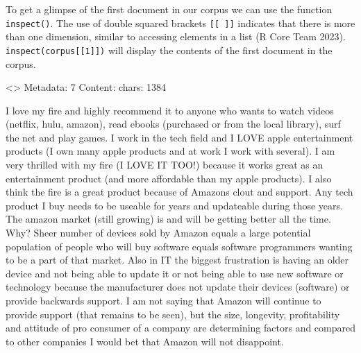 To get a glimpse of the first document in our corpus we can use the function
\texttt{inspect()}. The use of double squared brackets
\texttt{{[}{[}\ {]}{]}} indicates that there is more than one dimension,
similar to accessing elements in a list (R Core Team 2023).
\texttt{inspect(corpus{[}{[}1{]}{]})} will display the contents of the
first document in the corpus.

\begin{Shaded}
\begin{Highlighting}[]

\NormalTok{(} \NormalTok{)}

\OtherTok{\textless{}{-}} \NormalTok{(}\NormalTok{)}

\OtherTok{\textless{}{-}} \SpecialCharTok{$}

\OtherTok{\textless{}{-}} \NormalTok{(}

\NormalTok{(docs[[}\NormalTok{]])}
\end{Highlighting}
\end{Shaded}

\textless{}\textgreater{} Metadata: 7 Content: chars: 1384

I love my fire and highly recommend it to anyone who wants to watch
videos (netflix, hulu, amazon), read ebooks (purchased or from the local
library), surf the net and play games. I work in the tech field and I
LOVE apple entertainment products (I own many apple products and at work
I work with several). I am very thrilled with my fire (I LOVE IT TOO!)
because it works great as an entertainment product (and more affordable
than my apple products). I also think the fire is a great product
because of Amazons clout and support. Any tech product I buy needs to be
useable for years and updateable during those years. The amazon market
(still growing) is and will be getting better all the time. Why? Sheer
number of devices sold by Amazon equals a large potential population of
people who will buy software equals software programmers wanting to be a
part of that market. Also in IT the biggest frustration is having an
older device and not being able to update it or not being able to use
new software or technology because the manufacturer does not update
their devices (software) or provide backwards support. I am not saying
that Amazon will continue to provide support (that remains to be seen),
but the size, longevity, profitability and attitude of pro consumer of a
company are determining factors and compared to other companies I would
bet that Amazon will not disappoint.


